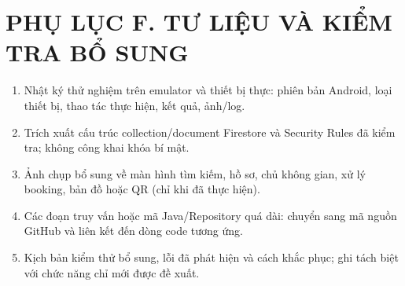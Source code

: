 \section*{PHỤ LỤC F. TƯ LIỆU VÀ KIỂM TRA BỔ SUNG}
\begin{enumerate}[leftmargin=*]
\item Nhật ký thử nghiệm trên emulator và thiết bị thực: phiên bản Android, loại thiết bị, thao tác thực hiện, kết quả, ảnh/log.
\item Trích xuất cấu trúc collection/document Firestore và Security Rules đã kiểm tra; không công khai khóa bí mật.
\item Ảnh chụp bổ sung về màn hình tìm kiếm, hồ sơ, chủ không gian, xử lý booking, bản đồ hoặc QR (chỉ khi đã thực hiện).
\item Các đoạn truy vấn hoặc mã Java/Repository quá dài: chuyển sang mã nguồn GitHub và liên kết đến dòng code tương ứng.
\item Kịch bản kiểm thử bổ sung, lỗi đã phát hiện và cách khắc phục; ghi tách biệt với chức năng chỉ mới được đề xuất.
\end{enumerate}



